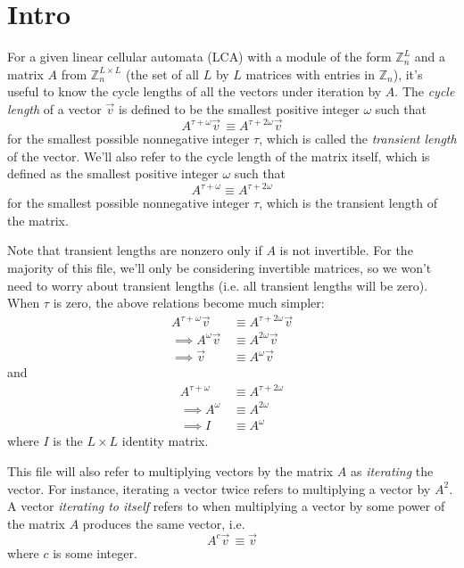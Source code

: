 \documentclass[a4paper, 12pt, reqno]{amsart}
\begin{document}
	\section{Intro}
	For a given linear cellular automata (LCA) with a module of the form $\mathds{Z}_{n}^L$ and a matrix $A$ from $\mathds{Z}_{n}^{L \times L}$ (the set of all $L$ by $L$ 
	matrices with entries in $\mathds{Z}_n$), it's useful to know the cycle lengths of all the vectors under iteration by $A$. The \emph{cycle length} of a vector $\vec{v}$ 
	is defined to be the smallest positive integer $\omega$ such that
	\[
		A^{\tau + \omega}\vec{v} \, \equiv A^{\tau + 2\omega}\vec{v}
	\]
	for the smallest possible nonnegative integer $\tau$, which is called the \emph{transient length} of the vector. We'll also refer to the cycle length of the matrix 
	itself, which is defined as the smallest positive integer $\omega$ such that
	\[
		A^{\tau + \omega} \equiv A^{\tau + 2\omega}
	\]
	for the smallest possible nonnegative integer $\tau$, which is the transient length of the matrix.
	
	Note that transient lengths are nonzero only if $A$ is not invertible. For the majority of this file, we'll only be considering invertible matrices, so we won't need to
	worry about transient lengths (i.e. all transient lengths will be zero). When $\tau$ is zero, the above relations become much simpler:
	\begin{align*}
		         A^{\tau + \omega}\vec{v} \, & \equiv A^{\tau + 2\omega}\vec{v} \\
		\implies A^{\omega}\vec{v}        \, & \equiv A^{2\omega}\vec{v}        \\
		\implies \vec{v}                  \, & \equiv A^{\omega}\vec{v}
	\end{align*}
	and
	\begin{align*}
		         A^{\tau + \omega} \, & \equiv A^{\tau + 2\omega} \\
		\implies A^{\omega}        \, & \equiv A^{2\omega}        \\
		\implies I                 \, & \equiv A^{\omega}
	\end{align*}
	where $I$ is the $L \times L$ identity matrix.
	
	This file will also refer to multiplying vectors by the matrix $A$ as \emph{iterating} the vector. For instance, iterating a vector twice refers to multiplying a vector
	by $A^2$. A vector \emph{iterating to itself} refers to when multiplying a vector by some power of the matrix $A$ produces the same vector, i.e.
	\[
		A^c\vec{v} \, \equiv \vec{v}
	\]
	where $c$ is some integer.
	
\end{document}

